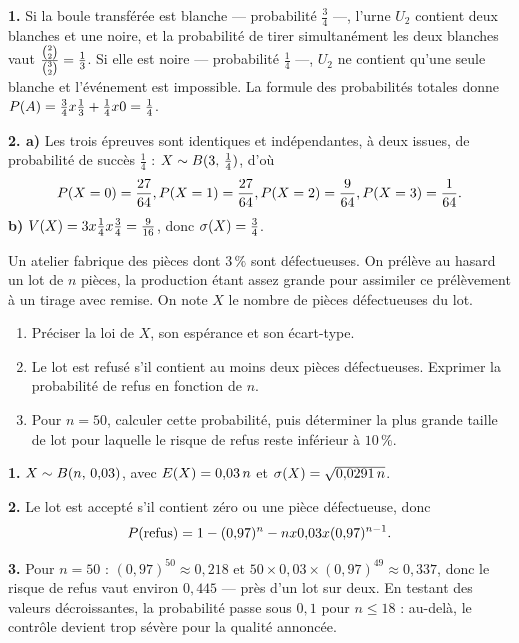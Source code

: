 \begin{corrige}
\textbf{1.} Si la boule transférée est blanche — probabilité $\frac34$ —,
l'urne $U_{2}$ contient deux blanches et une noire, et la probabilité de
tirer simultanément les deux blanches vaut
$\frac{\combi{2}{2}}{\combi{2}{3}} = \frac13$. Si elle est noire —
probabilité $\frac14$ —, $U_{2}$ ne contient qu'une seule blanche et
l'événement est impossible. La formule des probabilités totales donne
$\proba{A} = \frac34 \times \frac13+\frac14 \times 0 = \frac14$.

\textbf{2. a)} Les trois épreuves sont identiques et indépendantes, à deux
issues, de probabilité de succès $\frac14$ : $X \sim \loibin{3}{\frac14}$,
d'où
\[
  \proba{X = 0} = \frac{27}{64}, \quad \proba{X = 1} = \frac{27}{64},
  \quad \proba{X = 2} = \frac{9}{64}, \quad \proba{X = 3} = \frac{1}{64}.
\]
\textbf{b)} $\Var(X) = 3 \times \frac14 \times \frac34 = \frac{9}{16}$, donc
$\ecart(X) = \frac34$.
\end{corrige}

\begin{concours}
Un atelier fabrique des pièces dont $3\,\%$ sont défectueuses. On prélève au
hasard un lot de $n$ pièces, la production étant assez grande pour assimiler
ce prélèvement à un tirage avec remise. On note $X$ le nombre de pièces
défectueuses du lot.

\begin{enumerate}[label=\textbf{\arabic*.}, leftmargin=*, itemsep=0.25em]
  \item Préciser la loi de $X$, son espérance et son écart-type.
  \item Le lot est refusé s'il contient au moins deux pièces défectueuses.
        Exprimer la probabilité de refus en fonction de $n$.
  \item Pour $n = 50$, calculer cette probabilité, puis déterminer la plus
        grande taille de lot pour laquelle le risque de refus reste inférieur
        à $10\,\%$.
\end{enumerate}
\end{concours}

\begin{corrige}
\textbf{1.} $X \sim \loibin{n}{0{,}03}$, avec $\Esp(X) = 0{,}03\,n$ et
$\ecart(X) = \sqrt{0{,}0291\,n}$.

\textbf{2.} Le lot est accepté s'il contient zéro ou une pièce défectueuse,
donc
\[
  \proba{\text{refus}} = 1-(0{,}97)^{n}-n \times 0{,}03 \times (0{,}97)^{n-1}.
\]

\textbf{3.} Pour $n = 50$ : $(0{,}97)^{50} \approx 0{,}218$ et
$50 \times 0{,}03 \times (0{,}97)^{49} \approx 0{,}337$, donc le risque de
refus vaut environ $0{,}445$ — près d'un lot sur deux. En testant des valeurs
décroissantes, la probabilité passe sous $0{,}1$ pour $n \leq 18$ : au-delà,
le contrôle devient trop sévère pour la qualité annoncée.
\end{corrige}

